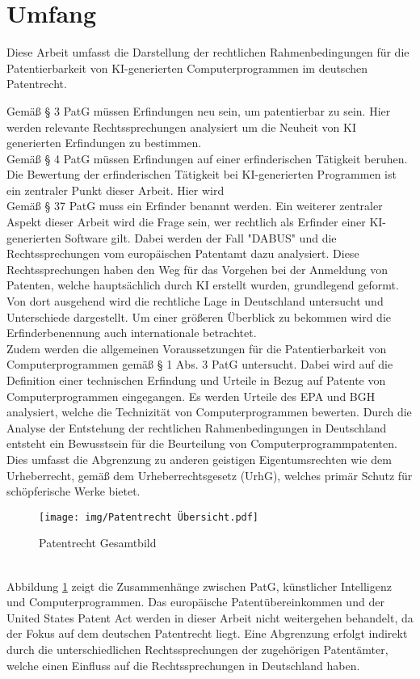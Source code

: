 \section{Umfang\label{sec:scope}}

Diese Arbeit umfasst die Darstellung der rechtlichen
Rahmenbedingungen für die Patentierbarkeit von KI-generierten
Computerprogrammen im deutschen Patentrecht.

Gemäß § 3 PatG müssen Erfindungen neu sein, 
um patentierbar zu sein. 
Hier werden relevante Rechtssprechungen 
analysiert um die Neuheit von KI generierten
Erfindungen zu bestimmen. 
\\
Gemäß § 4 PatG müssen Erfindungen auf einer erfinderischen Tätigkeit beruhen. 
Die Bewertung der erfinderischen Tätigkeit 
bei KI-generierten Programmen ist ein
zentraler Punkt dieser Arbeit. Hier wird 
\\
Gemäß § 37 PatG muss ein Erfinder benannt werden. 
Ein weiterer zentraler Aspekt dieser Arbeit wird die Frage sein, 
wer rechtlich als Erfinder einer KI-generierten Software gilt. 
Dabei werden der Fall "DABUS" und die Rechtssprechungen
vom europäischen Patentamt dazu analysiert. Diese Rechtssprechungen
haben den Weg für das Vorgehen bei der Anmeldung von Patenten, welche hauptsächlich
durch KI erstellt wurden, grundlegend geformt. Von dort ausgehend 
wird die rechtliche Lage in Deutschland untersucht und
Unterschiede dargestellt. Um einer größeren Überblick
zu bekommen wird die Erfinderbenennung auch internationale
betrachtet.
\\

Zudem
werden die allgemeinen Voraussetzungen 
für die Patentierbarkeit von Computerprogrammen gemäß § 1 Abs. 3 PatG untersucht. 
Dabei wird auf die Definition einer technischen Erfindung und Urteile
in Bezug auf Patente von Computerprogrammen eingegangen. Es
werden Urteile des EPA und BGH analysiert, welche
die Technizität von Computerprogrammen bewerten.
Durch die Analyse der Entstehung der rechtlichen Rahmenbedingungen
in Deutschland entsteht ein Bewusstsein für die 
Beurteilung von Computerprogrammpatenten.
Dies umfasst die Abgrenzung 
zu anderen geistigen Eigentumsrechten wie dem Urheberrecht, 
gemäß dem Urheberrechtsgesetz (UrhG), 
welches primär Schutz für schöpferische Werke bietet.
\\
\begin{figure}[htb]
  \centering
  \texttt{[image: img/Patentrecht Übersicht.pdf]}\\
  \caption{Patentrecht Gesamtbild}\label{fig:patentrecht}
\end{figure}
\\
Abbildung \ref{fig:patentrecht} zeigt die Zusammenhänge zwischen PatG, 
künstlicher Intelligenz und Computerprogrammen.
Das europäische Patentübereinkommen und der United States Patent Act 
werden in dieser Arbeit nicht weitergehen behandelt,
da der Fokus auf dem deutschen Patentrecht liegt.
Eine Abgrenzung erfolgt indirekt durch die unterschiedlichen
Rechtssprechungen der zugehörigen Patentämter, welche einen 
Einfluss auf die Rechtssprechungen in Deutschland haben.
\\


